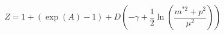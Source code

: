 \begin{equation}
Z=1+(\exp(A)-1)+D(-\gamma+\frac{1}{2}\ln(\frac{m^{\ast2}+p^{2}}{\mu^{2}}))
\end{equation}

